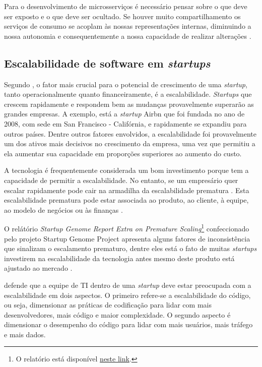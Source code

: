 Para o desenvolvimento de microsserviços é necessário pensar sobre o que deve ser
exposto e o que deve ser ocultado. Se houver muito compartilhamento os serviços de
consumo se acoplam às nossas representações internas, diminuindo a nossa autonomia
e consequentemente a nossa capacidade de realizar alterações \cite{Newman2015}.

\subsection{Escalabilidade de software em \textit{startups}}

Segundo , o fator mais crucial para o potencial
de crescimento de uma \textit{startup}, tanto operacionalmente quanto financeiramente,
é a escalabilidade. \textit{Startups} que crescem rapidamente e respondem bem as
mudanças provavelmente superarão as grandes empresas. A exemplo, está a \textit{startup}
Airbn que foi fundada no ano de 2008, com sede em San Francisco - Califórnia, e
rapidamente se expandiu para outros países. Dentre outros fatores envolvidos, a
escalabilidade foi provavelmente um dos ativos mais decisivos no crescimento da
empresa, uma vez que permitiu a ela aumentar sua capacidade em proporções superiores
ao aumento do custo.

A tecnologia é frequentemente considerada um bom investimento porque tem a capacidade
de permitir a escalabilidade. No entanto, se um empresário quer escalar rapidamente
pode cair na armadilha da escalabilidade prematura \cite{Kotsch2017}. Esta escalabilidade
prematura pode estar associada ao produto, ao cliente, à equipe, ao modelo de negócios
ou às finanças \cite{StartupGenome2011}.

O relátório \textit{Startup Genome Report Extra on Premature Scaling}\footnote{O relatório
está disponível \href{https://a4389177-39da-4622-a867-e7d6f48a3333.filesusr.com/ugd/fde30c_6b9eb284e987474899a746989086d8ee.pdf}
{neste link}.}
confeccionado pelo projeto Startup Genome Project apresenta alguns fatores de inconsistência
que sinalizam o escalamento prematuro, dentre eles está o fato de muitas \textit{startups}
investirem na escalabilidade da tecnologia antes mesmo deste produto está ajustado ao
mercado \cite{StartupGenome2011}.

 defende que a equipe de \gls{TI} dentro de uma \textit{startup}
deve estar preocupada com a escalabilidade em dois aspectos. O primeiro refere-se a
escalabilidade do código, ou seja, dimensionar as práticas de codificação para lidar
com mais desenvolvedores, mais código e maior complexidade. O segundo aspecto é dimensionar
o desempenho do código para lidar com mais usuários, mais tráfego e mais dados.

